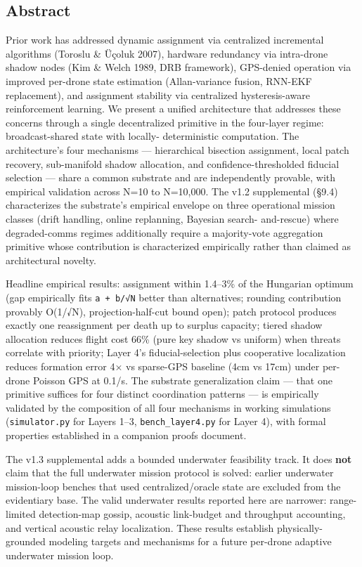 \subsection{Abstract}\label{abstract}

Prior work has addressed dynamic assignment via centralized incremental
algorithms (Toroslu \& Üçoluk 2007), hardware redundancy via intra-drone
shadow nodes (Kim \& Welch 1989, DRB framework), GPS-denied operation
via improved per-drone state estimation (Allan-variance fusion, RNN-EKF
replacement), and assignment stability via centralized hysteresis-aware
reinforcement learning. We present a unified architecture that addresses
these concerns through a single decentralized primitive in the
four-layer regime: broadcast-shared state with locally- deterministic
computation. The architecture's four mechanisms --- hierarchical
bisection assignment, local patch recovery, sub-manifold shadow
allocation, and confidence-thresholded fiducial selection --- share a
common substrate and are independently provable, with empirical
validation across N=10 to N=10,000. The v1.2 supplemental (§9.4)
characterizes the substrate's empirical envelope on three operational
mission classes (drift handling, online replanning, Bayesian search-
and-rescue) where degraded-comms regimes additionally require a
majority-vote aggregation primitive whose contribution is characterized
empirically rather than claimed as architectural novelty.

Headline empirical results: assignment within 1.4--3\% of the Hungarian
optimum (gap empirically fits \texttt{a\ +\ b/√N} better than
alternatives; rounding contribution provably O(1/√N),
projection-half-cut bound open); patch protocol produces exactly one
reassignment per death up to surplus capacity; tiered shadow allocation
reduces flight cost 66\% (pure key shadow vs uniform) when threats
correlate with priority; Layer 4's fiducial-selection plus cooperative
localization reduces formation error 4× vs sparse-GPS baseline (4cm vs
17cm) under per-drone Poisson GPS at 0.1/s. The substrate generalization
claim --- that one primitive suffices for four distinct coordination
patterns --- is empirically validated by the composition of all four
mechanisms in working simulations (\texttt{simulator.py} for Layers
1--3, \texttt{bench\_layer4.py} for Layer 4), with formal properties
established in a companion proofs document.

The v1.3 supplemental adds a bounded underwater feasibility track. It
does \textbf{not} claim that the full underwater mission protocol is
solved: earlier underwater mission-loop benches that used
centralized/oracle state are excluded from the evidentiary base. The
valid underwater results reported here are narrower: range-limited
detection-map gossip, acoustic link-budget and throughput accounting,
and vertical acoustic relay localization. These results establish
physically-grounded modeling targets and mechanisms for a future
per-drone adaptive underwater mission loop.

